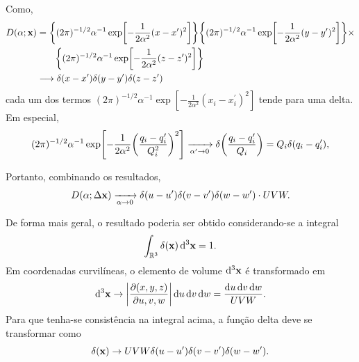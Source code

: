 Como,
\begin{align*}
  D(\alpha; \vb{x})
  &= \qty{(2\pi)^{-1/2}\alpha^{-1} \exp[-\frac{1}{2 \alpha^2} (x-x^\prime)^2]} \qty{(2\pi)^{-1/2}\alpha^{-1} \exp[-\frac{1}{2 \alpha^2} (y-y^\prime)^2]} \times
  \\
  &\qquad  \qty{(2\pi)^{-1/2}\alpha^{-1} \exp[-\frac{1}{2 \alpha^2} (z-z^\prime)^2]}
  \\
  &\longrightarrow \delta(x - x^\prime) \delta(y - y^\prime) \delta(z - z^\prime)
\end{align*}
cada um dos termos $(2\pi)^{-1/2}\alpha^{-1} \exp[-\frac{1}{2 \alpha^2} (x_i - x_i^\prime)^2]$ tende para uma delta. Em especial,
\begin{equation*}
  (2\pi)^{-1/2}\alpha^{-1} \exp[-\frac{1}{2 \alpha^2} \qty(\frac{q_i - q_i^\prime}{Q_i^2})^2] \xrightarrow[\alpha^\prime \to 0]{} \delta\qty(\frac{q_i - q_i^\prime}{Q_i}) = Q_i \delta(q_i - q_i^\prime),
\end{equation*}

Portanto, combinando os resultados,
\begin{equation*}
  D(\alpha; \Delta\vb{x}) \xrightarrow[\alpha \to 0]{} \delta(u - u^\prime) \delta(v - v^\prime) \delta(w - w^\prime) \cdot UVW.
\end{equation*}

\vspace{5mm}
De forma mais geral, o resultado poderia ser obtido considerando-se a integral
\begin{equation*}
  \int_{\mathbb{R}^3} \delta(\vb{x}) \dd[3]{\vb{x}} = 1.
\end{equation*}
Em coordenadas curvilíneas, o elemento de volume $\dd[3]{\vb{x}}$ é transformado em
\[
  \dd[3]{\vb{x}} \to \abs{\pdv{(x, y, z)}{u, v, w}} \dd{u}\dd{v}\dd{w} = \frac{\dd{u}\dd{v}\dd{w}}{UVW}.
\]
Para que tenha-se consistência na integral acima, a função delta deve se transformar como
\begin{equation*}
  \delta(\vb{x}) \to UVW \delta(u - u^\prime) \delta(v - v^\prime) \delta(w - w^\prime).
\end{equation*}



\newpage
{}


